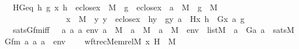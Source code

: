 \begin{isabellebody}
\ \ \ HGeq{\isacharcolon}{\kern0pt}\ {\isachardoublequoteopen}{\isasymAnd}h\ g\ x{\isachardot}{\kern0pt}\ h\ {\isasymin}\ eclose{\isacharparenleft}{\kern0pt}x{\isacharparenright}{\kern0pt}\ {\isasymrightarrow}\ M\ {\isasymLongrightarrow}\ g\ {\isasymin}\ {\isacharparenleft}{\kern0pt}eclose{\isacharparenleft}{\kern0pt}x{\isacharparenright}{\kern0pt}\ {\isasymtimes}\ {\isacharbraceleft}{\kern0pt}a{\isacharbraceright}{\kern0pt}{\isacharparenright}{\kern0pt}\ {\isasymrightarrow}\ M\ {\isasymLongrightarrow}\ g\ {\isasymin}\ M\ \ \isanewline
\ \ \ \ \ \ \ \ \ \ \ \ \ \ \ {\isasymLongrightarrow}\ x\ {\isasymin}\ M\ {\isasymLongrightarrow}\ {\isacharparenleft}{\kern0pt}{\isasymAnd}y{\isachardot}{\kern0pt}\ y\ {\isasymin}\ eclose{\isacharparenleft}{\kern0pt}x{\isacharparenright}{\kern0pt}\ {\isasymLongrightarrow}\ h{\isacharbackquote}{\kern0pt}y\ {\isacharequal}{\kern0pt}\ g{\isacharbackquote}{\kern0pt}{\isacharless}{\kern0pt}y{\isacharcomma}{\kern0pt}\ a{\isachargreater}{\kern0pt}{\isacharparenright}{\kern0pt}\ {\isasymLongrightarrow}\ H{\isacharparenleft}{\kern0pt}x{\isacharcomma}{\kern0pt}\ h{\isacharparenright}{\kern0pt}\ {\isacharequal}{\kern0pt}\ G{\isacharparenleft}{\kern0pt}{\isacharless}{\kern0pt}x{\isacharcomma}{\kern0pt}\ a{\isachargreater}{\kern0pt}{\isacharcomma}{\kern0pt}\ g{\isacharparenright}{\kern0pt}{\isachardoublequoteclose}\ \ \isanewline
\ \ \ sats{\isacharunderscore}{\kern0pt}Gfm{\isacharunderscore}{\kern0pt}iff\ {\isacharcolon}{\kern0pt}\ {\isachardoublequoteopen}\ {\isacharparenleft}{\kern0pt}{\isasymAnd}a{}\ a{}\ a{}\ env{\isachardot}{\kern0pt}\ a{}\ {\isasymin}\ M\ {\isasymLongrightarrow}\ a{}\ {\isasymin}\ M\ {\isasymLongrightarrow}\ a{}\ {\isasymin}\ M\ {\isasymLongrightarrow}\ env\ {\isasymin}\ list{\isacharparenleft}{\kern0pt}M{\isacharparenright}{\kern0pt}\ {\isasymLongrightarrow}\ a{}\ {\isacharequal}{\kern0pt}\ G{\isacharparenleft}{\kern0pt}a{}{\isacharcomma}{\kern0pt}\ a{}{\isacharparenright}{\kern0pt}\ {\isasymlongleftrightarrow}\ sats{\isacharparenleft}{\kern0pt}M{\isacharcomma}{\kern0pt}\ Gfm{\isacharcomma}{\kern0pt}\ {\isacharbrackleft}{\kern0pt}a{}{\isacharcomma}{\kern0pt}\ a{}{\isacharcomma}{\kern0pt}\ a{}{\isacharbrackright}{\kern0pt}\ {\isacharat}{\kern0pt}\ env{\isacharparenright}{\kern0pt}{\isacharparenright}{\kern0pt}{\isachardoublequoteclose}\ \isanewline
\isanewline
\ \ \ {\isachardoublequoteopen}wftrec{\isacharparenleft}{\kern0pt}Memrel{\isacharparenleft}{\kern0pt}M{\isacharparenright}{\kern0pt}{\isacharcircum}{\kern0pt}{\isacharplus}{\kern0pt}{\isacharcomma}{\kern0pt}\ x{\isacharcomma}{\kern0pt}\ H{\isacharparenright}{\kern0pt}\ {\isasymin}\ M{\isachardoublequoteclose}\isanewline

\end{isabellebody}
